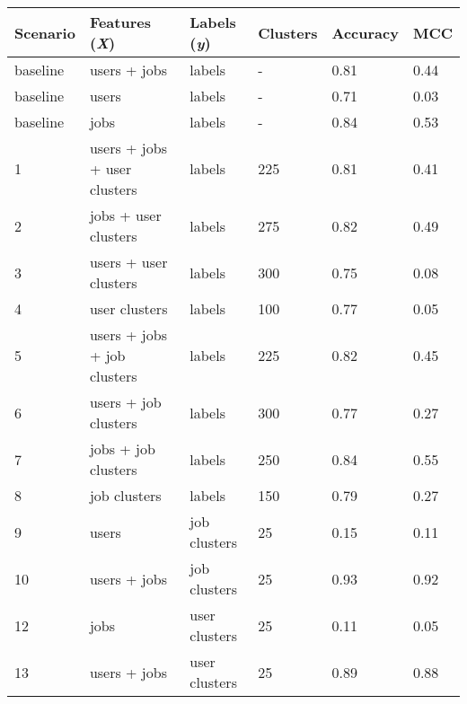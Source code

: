\begin{tabular}{llllll}
\toprule
\textbf{Scenario}   & \textbf{Features (\textit{X})}    & \textbf{Labels (\textit{y})}  & \textbf{Clusters} & \textbf{Accuracy} & \textbf{MCC}        \\
\midrule
baseline            & users + jobs                      & labels                        & -                     & 0.81              & 0.44            \\
baseline            & users                             & labels                        & -                     & 0.71              & 0.03            \\
baseline            & jobs                              & labels                        & -                     & 0.84              & 0.53            \\
\midrule
1                   & users + jobs + user clusters      & labels                        & 225                   & 0.81              & 0.41            \\ %
2                   & jobs + user clusters              & labels                        & 275                   & 0.82              & 0.49            \\ %
3                   & users + user clusters             & labels                        & 300                   & 0.75              & 0.08            \\ %
4                   & user clusters                     & labels                        & 100                   & 0.77              & 0.05            \\ %
5                   & users + jobs + job clusters       & labels                        & 225                   & 0.82              & 0.45            \\ %
6                   & users + job clusters              & labels                        & 300                   & 0.77              & 0.27            \\ %
7                   & jobs + job clusters               & labels                        & 250                   & 0.84              & 0.55            \\ %
8                   & job clusters                      & labels                        & 150                   & 0.79              & 0.27            \\ %
9                   & users                             & job clusters                  & 25                    & 0.15              & 0.11            \\ %
10                  & users + jobs                      & job clusters                  & 25                    & 0.93              & 0.92            \\ %
12                  & jobs                              & user clusters                 & 25                    & 0.11              & 0.05            \\ %
13                  & users + jobs                      & user clusters                 & 25                    & 0.89              & 0.88            \\ %
\bottomrule
\end{tabular}

